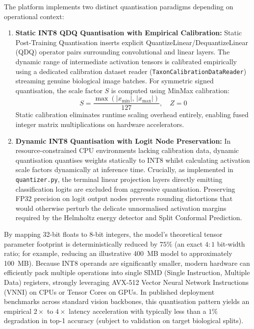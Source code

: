 The platform implements two distinct quantisation paradigms depending on operational context:
\begin{enumerate}
    \item \textbf{Static INT8 QDQ Quantisation with Empirical Calibration:} Static Post-Training Quantisation inserts explicit QuantizeLinear/DequantizeLinear (QDQ) operator pairs surrounding convolutional and linear layers. The dynamic range of intermediate activation tensors is calibrated empirically using a dedicated calibration dataset reader (\texttt{Taxon\-Calibration\-Data\-Reader}) streaming genuine biological image batches. For symmetric signed quantisation, the scale factor $S$ is computed using MinMax calibration:
    \begin{equation}
    S = \frac{\max\left( |x_{\min}|, \, |x_{\max}| \right)}{127}, \quad Z = 0
    \label{eq:minmax_calibration}
    \end{equation}
    Static calibration eliminates runtime scaling overhead entirely, enabling fused integer matrix multiplications on hardware accelerators.
    \item \textbf{Dynamic INT8 Quantisation with Logit Node Preservation:} In resource-constrained CPU environments lacking calibration data, dynamic quantisation quantises weights statically to INT8 whilst calculating activation scale factors dynamically at inference time. Crucially, as implemented in \nolinkurl{quantizer.py}, the terminal linear projection layers directly emitting classification logits are excluded from aggressive quantisation. Preserving FP32 precision on logit output nodes prevents rounding distortions that would otherwise perturb the delicate unnormalised activation margins required by the Helmholtz energy detector and Split Conformal Prediction.
\end{enumerate}

By mapping 32-bit floats to 8-bit integers, the model's theoretical tensor parameter footprint is deterministically reduced by $75\%$ (an exact $4:1$ bit-width ratio; for example, reducing an illustrative 400~MB model to approximately 100~MB). Because INT8 operands are significantly smaller, modern hardware can efficiently pack multiple operations into single SIMD (Single Instruction, Multiple Data) registers, strongly leveraging AVX-512 Vector Neural Network Instructions (VNNI) on CPUs or Tensor Cores on GPUs. In published deployment benchmarks across standard vision backbones, this quantisation pattern yields an empirical $2\times$ to $4\times$ latency acceleration with typically less than a $1\%$ degradation in top-1 accuracy (subject to validation on target biological splits).

